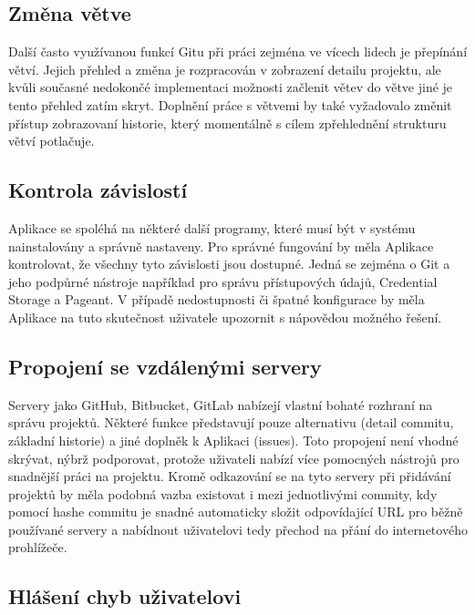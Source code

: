 \subsection{Změna větve}

Další často využívanou funkcí Gitu při práci zejména ve vícech lidech je přepínání větví. Jejich přehled a změna je rozpracován v zobrazení detailu projektu, ale kvůli současné nedokončé implementaci možnosti začlenit větev do větve jiné je tento přehled zatím skryt. Doplnění práce s větvemi by také vyžadovalo změnit přístup zobrazovaní historie, který momentálně s cílem zpřehlednění strukturu větví potlačuje.

\subsection{Kontrola závislostí}

Aplikace se spoléhá na některé další programy, které musí být v systému nainstalovány a správně nastaveny. Pro správné fungování by měla Aplikace kontrolovat, že všechny tyto závislosti jsou dostupné. Jedná se zejména o Git a jeho podpůrné nástroje například pro správu přístupových údajů, Credential Storage a Pageant. V případě nedostupnosti či špatné konfigurace by měla Aplikace na tuto skutečnost uživatele upozornit s nápovědou možného řešení.

\subsection{Propojení se vzdálenými servery}

Servery jako GitHub, Bitbucket, GitLab nabízejí vlastní bohaté rozhraní na správu projektů. Některé funkce představují pouze alternativu (detail commitu, základní historie) a jiné doplněk k Aplikaci (issues). Toto propojení není vhodné skrývat, nýbrž podporovat, protože uživateli nabízí více pomocných nástrojů pro snadnější práci na projektu. Kromě odkazování se na tyto servery při přidávání projektů by měla podobná vazba existovat i mezi jednotlivými commity, kdy pomocí hashe commitu je snadné automaticky složit odpovídající URL pro běžně používané servery a nabídnout uživatelovi tedy přechod na přání do internetového prohlížeče.

\subsection{Hlášení chyb uživatelovi}

